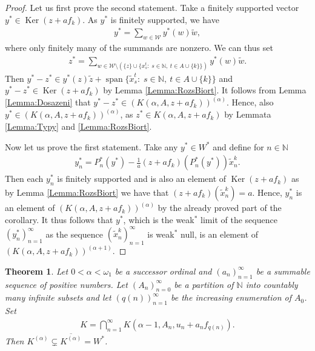 \documentclass{amsart}
\newtheorem{theorem}{Theorem}[section]
\theoremstyle{definition}
\begin{document}
\begin{proof}
    Let us first prove the second statement. Take a finitely supported vector $y^* \in \operatorname{Ker}(z + a f_k)$. As $y^*$ is finitely supported, we have
    \begin{align*}
        y^* = \sum_{w \in \mathcal{W}} y^*(w) \widetilde{w},
    \end{align*}
    where only finitely many of the summands are nonzero. We can thus set
    \begin{align*}
        z^* = \sum_{w \in \mathcal{W} \setminus \left(\{z\} \cup \{x^t_s: \; s \in \mathbb{N}, \: t \in A \cup \{k\}\}\right)} y^*(w) \widetilde{w}.
    \end{align*}
    Then $y^* - z^* \in y^*(z) \widetilde{z} + \operatorname{span} \{\widetilde{x}^t_s: \; s \in \mathbb{N}, \: t \in A \cup \{k\}\}$ and $y^* - z^* \in \operatorname{Ker}(z + a f_k)$ by Lemma \ref{Lemma:RozsBiort}. It follows from Lemma \ref{Lemma:Dosazeni} that $y^* - z^* \in \left( K(\alpha,A,z + a f_k) \right)^{(\alpha)}$. Hence, also $y^* \in \left( K(\alpha,A,z + a f_k) \right)^{(\alpha)}$, as $z^* \in K(\alpha,A, z + a f_k)$ by Lemmata \ref{Lemma:Typy} and \ref{Lemma:RozsBiort}.
    
    Now let us prove the first statement. Take any $y^* \in W^*$ and define for $n \in \mathbb{N}$
    \begin{align*}
        y_n^* = P_n^*(y^*) - \frac{1}{a} (z + a f_k)(P_n^*(y^*)) \widetilde{x}^k_n.
    \end{align*}
    Then each $y_n^*$ is finitely supported and is also an element of $\operatorname{Ker}(z + a f_k)$ as by Lemma \ref{Lemma:RozsBiort} we have that $(z+af_k)(\widetilde{x}^k_n) = a$. Hence, $y_n^*$ is an element of $\left( K(\alpha,A,z + a f_k) \right)^{(\alpha)}$ by the already proved part of the corollary. It thus follows that $y^*$, which is the weak$^*$ limit of the sequence $(y_n^*)_{n=1}^\infty$ as the sequence $(\widetilde{x}^k_n)_{n=1}^\infty$ is weak$^*$ null, is an element of $\left( K(\alpha,A,z + a f_k) \right)^{(\alpha+1)}$.
\end{proof}

\begin{theorem} \label{Theorem:MainW}
    Let $0 < \alpha < \omega_1$ be a successor ordinal and $(a_n)_{n=1}^\infty$ be a summable sequence of positive numbers. Let $(A_n)_{n=0}^\infty$ be a partition of $\mathbb{N}$ into countably many infinite subsets and let $(q(n))_{n=1}^\infty$ be the increasing enumeration of $A_0$. Set
    \begin{align*}
        K = \bigcap_{n=1}^\infty K(\alpha - 1,A_n, u_n + a_n f_{q(n)}).
    \end{align*}
    Then $K^{(\alpha)} \subsetneq \overline{K^{(\alpha)}} = W^{*}$.
\end{theorem}
\end{document}
